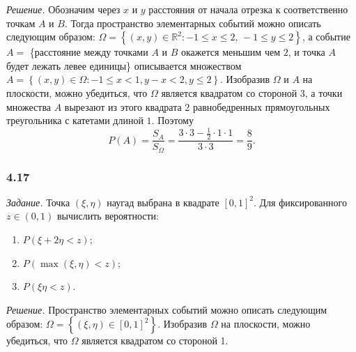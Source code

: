 \textit{Решение.} Обозначим через $x$ и $y$ расстояния от начала отрезка к соответственно точкам $A$ и $B$.
Тогда пространство элементарных событий можно описать следующим образом:
$ \Omega =
\left\{ \left( x, y \right) \in \mathbb{R}^2: -1 \leq x \leq 2, \, -1 \leq y \leq 2 \right\}$,
а событие $A = $ \{расстояние между точками $A$ и $B$ окажется меньшим чем $2$, и точка $A$ будет лежать левее единицы\}
описывается множеством $A = \left\{ \left( x, y \right) \in \Omega: -1 \leq x < 1, y - x < 2, y \leq 2 \right\}$.
Изобразив $ \Omega $ и $A$ на плоскости, можно убедиться, что $ \Omega $ является квадратом со стороной $3$,
а точки множества $A$ вырезают из этого квадрата 2 равнобедренных прямоугольных треугольника с катетами длиной $1$.
Поэтому
$$P \left( A \right) =
\frac{S_A}{S_{ \Omega }} =
\frac{3 \cdot 3 - \frac{1}{2} \cdot 1 \cdot 1}{3 \cdot 3} =
\frac{8}{9}.$$

\subsubsection*{4.17}

\textit{Задание.} Точка $ \left( \xi, \eta \right) $ наугад выбрана в квадрате $ \left[ 0, 1 \right]^2$.
Для фиксированного $z \in \left( 0, 1 \right) $ вычислить вероятности:
\begin{enumerate}[label=\alph*)]
\item $P \left( \xi + 2 \eta < z \right) $;
\item $P \left( \max \left( \xi, \eta \right) < z \right) $;
\item $P \left( \xi \eta < z \right) $.
\end{enumerate}

\textit{Решение.} Пространство элементарных событий можно описать следующим образом:
$ \Omega =
\left\{ \left( \xi, \eta \right) \in \left[ 0, 1 \right]^2 \right\}$.
Изобразив $ \Omega $ на плоскости, можно убедиться, что $ \Omega $ является квадратом со стороной 1.

